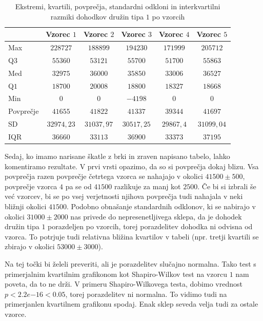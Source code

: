 \documentclass[a4paper, 10pt]{article}
\begin{document}
	\begin{table}[h!]
		\label{tab: QuartMeanA}
		\centering
		\begin{tabular}{|l|c|c|c|c|c|}
			\hline
			 & Vzorec $1$ & Vzorec $2$ & Vzorec $3$ & Vzorec $4$ & Vzorec $5$ \\ \hline
			Max & $228727$ & $188899$ & $194230$ & $171999$ & $205712$ \\ \hline
			Q$3$ & $55360$ & $53121$ & $55700$ & $51700$ & $55863$ \\ \hline
			Med & $32975$ & $36000$ & $35850$ & $33006$ & $36527$ \\ \hline
			Q$1$ & $18700$ & $20008$ & $18800$ & $18327$ & $18668$ \\ \hline
			Min & $0$ & $0$ & $-4198$ & $0$ & $0$ \\ \hline
			\hline
			Povprečje & $41655$ & $41822$ & $41337$ & $39344$ & $41697$ \\ \hline
			SD & $32974{,}23$ & $31037{,}97$ & $30517{,}25$ & $29867{,}4$ & $31099{,}04$ \\ \hline
			IQR & $36660$ & $33113$ & $36900$ & $33373$ & $37195$ \\ \hline
		\end{tabular}
		\caption{Ekstremi, kvartili, povprečja, standardni odkloni in interkvartilni razmiki dohodkov družin tipa $1$ po vzorcih}
	\end{table}
	
	Sedaj, ko imamo narisane škatle z brki in zraven napisano tabelo, lahko komentiramo rezultate. V prvi vrsti opazimo, da so si povprečja dokaj blizu. Vsa povprečja razen povprečje četrtega vzorca se nahajajo v okolici $41500 \pm 500$, povprečje vzorca $4$ pa se od $41500$ razlikuje za manj kot $2500$. Če bi si izbrali še već vzorcev, bi se po vsej verjetnosti njihova povprečja tudi nahajala v neki bližnji okolici $41500$. Podobno obnašanje standardnih odklonov, ki se nabirajo v okolici $31000 \pm 2000$ nas privede do nepresenetljivega sklepa, da je dohodek družin tipa $1$ porazdeljen po vzorcih, torej porazdelitev dohodka ni odvisna od vzorca. To potrjuje tudi relativna bližina kvartilov v tabeli (npr. tretji kvartili se zbirajo v okolici $53000 \pm 3000$).
	
	Na tej točki bi želeli preveriti, ali je porazdelitev slučajno normalna. Tako test s primerjalnim kvartilnim grafikonom kot Shapiro-Wilkov test na vzorcu $1$ nam poveta, da to ne drži. V primeru Shapiro-Wilkovega testa, dobimo vrednost $p < 2.2e{-16} < 0.05$, torej porazdelitev ni normalna. To vidimo tudi na primerjanlen kvartilnem grafikonu spodaj. Enak sklep seveda velja tudi za ostale vzorce.
	
\end{document}
